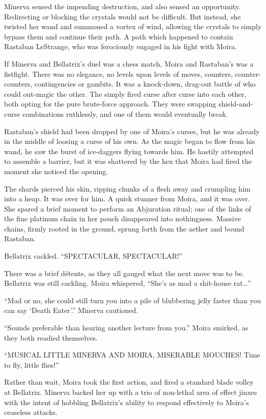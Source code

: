 Minerva sensed the impending destruction, and also sensed an opportunity. Redirecting or blocking the crystals would not be difficult. But instead, she twisted her wand and summoned a vortex of wind, allowing the crystals to simply bypass them and continue their path. A path which happened to contain Rastaban LeStrange, who was ferociously engaged in his fight with Moira.

If Minerva and Bellatrix’s duel was a chess match, Moira and Rastaban’s was a fistfight. There was no elegance, no levels upon levels of moves, counters, counter-counters, contingencies or gambits. It was a knock-down, drag-out battle of who could out-magic the other. The simply fired curse after curse into each other, both opting for the pure brute-force approach. They were swapping shield-and-curse combinations ruthlessly, and one of them would eventually break.

Rastaban’s shield had been dropped by one of Moira’s curses, but he was already in the middle of loosing a curse of his own. As the magic began to flow from his wand, he saw the burst of ice-daggers flying towards him. He hastily attempted to assemble a barrier, but it was shattered by the hex that Moira had fired the moment she noticed the opening.

The shards pierced his skin, ripping chunks of a flesh away and crumpling him into a heap. It was over for him. A quick stunner from Moira, and it was over. She spared a brief moment to perform an Abjuration ritual; one of the links of the fine platinum chain in her pouch disappeared into nothingness. Massive chains, firmly rooted in the ground, sprung forth from the aether and bound Rastaban.

Bellatrix cackled. “SPECTACULAR, SPECTACULAR!”

There was a brief détente, as they all gauged what the next move was to be. Bellatrix was still cackling. Moira whispered, “She’s as mad a shit-house rat…”

“Mad or no, she could still turn you into a pile of blubbering jelly faster than you can say ‘Death Eater’.” Minerva cautioned.

“Sounds preferable than hearing another lecture from you.” Moira smirked, as they both readied themselves.

“MUSICAL LITTLE MINERVA AND MOIRA, MISERABLE MOUCHES! Time to fly, little flies!”

Rather than wait, Moira took the first action, and fired a standard blade volley at Bellatrix. Minerva backed her up with a trio of non-lethal area of effect jinxes with the intent of hobbling Bellatrix’s ability to respond effectively to Moira’s ceaseless attacks.

